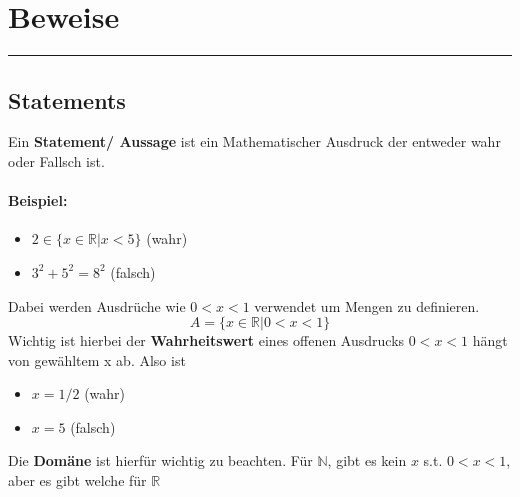 \newcommand{\defbox}[2]{
\vspace{1cm}
\noindent
  \begin{tcolorbox}[colframe=red, colback=white, width=\linewidth, title=#1]
    #2
  \end{tcolorbox}
  \vspace{1cm}
}

\newcommand{\proofbox}[3]{%
    \begin{proof}
        \\ \textbf{Annahme:}
        \begin{align*}
            #1
        \end{align*}
        \textbf{Zeige:} #2
        \begin{align*}
            #3
        \end{align*}
    \end{proof}%
}


\section{Beweise}
    \rule{\textwidth}{0.4pt}
    \subsection{Statements} 
        Ein \textbf{Statement/ Aussage} ist ein Mathematischer Ausdruck der entweder wahr oder Fallsch ist. 
    \paragraph{Beispiel: } 
    \begin{itemize}
        \item $2 \in \{x \in \mathbb{R} \vert x < 5\}$ (wahr)
        \item $3^2 + 5^2 = 8^2$ (falsch)
    \end{itemize} 
    Dabei werden Ausdrüche wie $0 < x < 1$ verwendet um Mengen zu definieren. \[A = \{x\in\mathbb{R} \vert 0 < x < 1\}\] Wichtig ist hierbei der \textbf{Wahrheitswert} eines offenen Ausdrucks $0 < x < 1$ hängt von gewähltem x ab. Also ist 
    \begin{itemize}
        \item $x = 1/2$ (wahr) 
        \item $x = 5 $ (falsch)
    \end{itemize}
    Die \textbf{Domäne} ist hierfür wichtig zu beachten. Für $\mathbb{N}$, gibt es kein $x$ s.t. $0 < x < 1$, aber es gibt welche für $\mathbb{R}$

